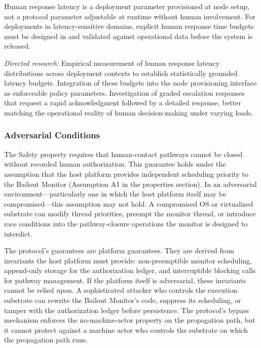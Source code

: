 Human response latency is a deployment parameter provisioned at node setup, not a protocol parameter adjustable at runtime without human involvement. For deployments in latency-sensitive domains, explicit human response time budgets must be designed in and validated against operational data before the system is released.

\textit{Directed research:} Empirical measurement of human response latency distributions across deployment contexts to establish statistically grounded latency budgets. Integration of these budgets into the node provisioning interface as enforceable policy parameters. Investigation of graded escalation responses that request a rapid acknowledgment followed by a detailed response, better matching the operational reality of human decision-making under varying loads.

\subsubsection{Adversarial Conditions}

The Safety property requires that human-contact pathways cannot be closed without recorded human authorization. This guarantee holds under the assumption that the host platform provides independent scheduling priority to the Bailout Monitor (Assumption A1 in the properties section). In an adversarial environment---particularly one in which the host platform itself may be compromised---this assumption may not hold. A compromised OS or virtualized substrate can modify thread priorities, preempt the monitor thread, or introduce race conditions into the pathway-closure operations the monitor is designed to interdict.

The protocol's guarantees are platform guarantees. They are derived from invariants the host platform must provide: non-preemptible monitor scheduling, append-only storage for the authorization ledger, and interruptible blocking calls for pathway management. If the platform itself is adversarial, these invariants cannot be relied upon. A sophisticated attacker who controls the execution substrate can rewrite the Bailout Monitor's code, suppress its scheduling, or tamper with the authorization ledger before persistence. The protocol's bypass mechanism enforces the no-machine-actor property on the propagation path, but it cannot protect against a machine actor who controls the substrate on which the propagation path runs.

